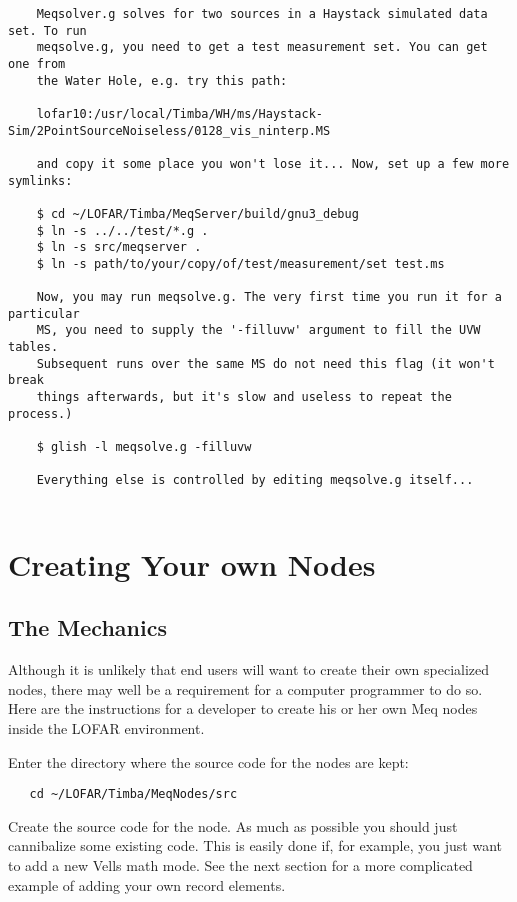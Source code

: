 \documentclass[10pt]{article}
\begin{document}
\begin{verbatim}
    Meqsolver.g solves for two sources in a Haystack simulated data set. To run
    meqsolve.g, you need to get a test measurement set. You can get one from
    the Water Hole, e.g. try this path: 

    lofar10:/usr/local/Timba/WH/ms/Haystack-Sim/2PointSourceNoiseless/0128_vis_ninterp.MS

    and copy it some place you won't lose it... Now, set up a few more symlinks:

    $ cd ~/LOFAR/Timba/MeqServer/build/gnu3_debug
    $ ln -s ../../test/*.g .
    $ ln -s src/meqserver .
    $ ln -s path/to/your/copy/of/test/measurement/set test.ms

    Now, you may run meqsolve.g. The very first time you run it for a particular
    MS, you need to supply the '-filluvw' argument to fill the UVW tables.
    Subsequent runs over the same MS do not need this flag (it won't break
    things afterwards, but it's slow and useless to repeat the process.)

    $ glish -l meqsolve.g -filluvw

    Everything else is controlled by editing meqsolve.g itself...
    
\end{verbatim}
     
\section{Creating Your own Nodes }

\subsection{The Mechanics}

Although it is unlikely that end users will want to create their
own specialized nodes, there may well be a requirement for a computer 
programmer to do so. Here are the instructions for a developer
to create his or her own Meq nodes inside the LOFAR environment.

Enter the directory where the source code for the nodes are kept:

\begin{verbatim}
   cd ~/LOFAR/Timba/MeqNodes/src
\end{verbatim}

Create the source code for the node. As much as possible
you should just cannibalize some existing code. This is easily done
if, for example, you just want to add a new Vells math mode.
See the next section for a more complicated example of adding
your own record elements.
\end{document}
